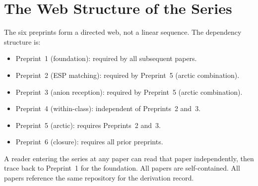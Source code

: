 \documentclass[11pt]{article}
\theoremstyle{plain}
\theoremstyle{definition}
\theoremstyle{remark}
\begin{document}
\section{The Web Structure of the Series}
\label{app:web_structure}

The six preprints form a directed web, not a linear sequence.
The dependency structure is:

\begin{itemize}[leftmargin=2em]
  \item Preprint~1 (foundation): required by all subsequent papers.
  \item Preprint~2 (ESP matching): required by Preprint~5
        (arctic combination).
  \item Preprint~3 (anion reception): required by Preprint~5
        (arctic combination).
  \item Preprint~4 (within-class): independent of Preprints~2 and~3.
  \item Preprint~5 (arctic): requires Preprints~2 and~3.
  \item Preprint~6 (closure): requires all prior preprints.
\end{itemize}

A reader entering the series at any paper can read that paper
independently, then trace back to Preprint~1 for the foundation.
All papers are self-contained.  All papers reference the same
repository for the derivation record.
\end{document}
